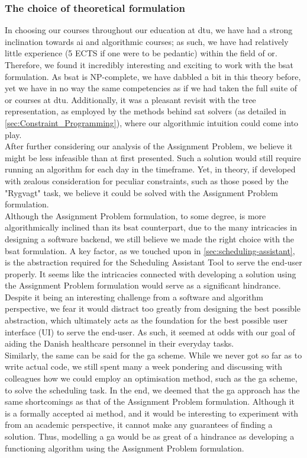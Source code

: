 \subsubsection*{The choice of theoretical formulation}
In choosing our courses throughout our education at \acrshort{dtu}, we have had a strong inclination towards \acrshort{ai} and algorithmic courses; as such, we have had relatively little experience (5 ECTS if one were to be pedantic) within the field of \acrshort{or}. Therefore, we found it incredibly interesting and exciting to work with the \acrshort{bsat} formulation. As \acrshort{bsat} is NP-complete, we have dabbled a bit in this theory before, yet we have in no way the same competencies as if we had taken the full suite of \acrshort{or} courses at \acrshort{dtu}. Additionally, it was a pleasant revisit with the tree representation, as employed by the methods behind \acrshort{sat} solvers (as detailed in \autoref{sec:Constraint_Programming}), where our algorithmic intuition could come into play.
\\
After further considering our analysis of the Assignment Problem, we believe it might be less infeasible than at first presented. Such a solution would still require running an algorithm for each day in the timeframe. Yet, in theory, if developed with zealous consideration for peculiar constraints, such as those posed by the "Rygvagt" task, we believe it could be solved with the Assignment Problem formulation.
\\
Although the Assignment Problem formulation, to some degree, is more algorithmically inclined than its \acrshort{bsat} counterpart, due to the many intricacies in designing a software backend, we still believe we made the right choice with the \acrshort{bsat} formulation. A key factor, as we touched upon in \autoref{sec:scheduling-assistant}, is the abstraction required for the Scheduling Assistant Tool to serve the end-user properly. It seems like the intricacies connected with developing a solution using the Assignment Problem formulation would serve as a significant hindrance. Despite it being an interesting challenge from a software and algorithm perspective, we fear it would distract too greatly from designing the best possible abstraction, which ultimately acts as the foundation for the best possible user interface (UI) to serve the end-user. As such, it seemed at odds with our goal of aiding the Danish healthcare personnel in their everyday tasks.
\\
Similarly, the same can be said for the \acrshort{ga} scheme. While we never got so far as to write actual code, we still spent many a week pondering and discussing with colleagues how we could employ an optimisation method, such as the \acrshort{ga} scheme, to solve the scheduling task. In the end, we deemed that the \acrshort{ga} approach has the same shortcomings as that of the Assignment Problem formulation. Although it is a formally accepted \acrshort{ai} method, and it would be interesting to experiment with from an academic perspective, it cannot make any guarantees of finding a solution. Thus, modelling a \acrshort{ga} would be as great of a hindrance as developing a functioning algorithm using the Assignment Problem formulation.
